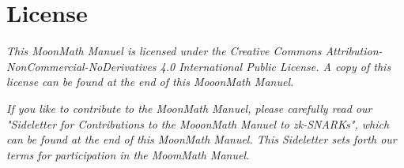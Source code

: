 \newpage
\thispagestyle{empty}
\mbox{}
\newpage

\chapter*{License}
\textit{This MoonMath Manuel is licensed under the Creative Commons Attribution-NonCommercial-NoDerivatives 4.0 International Public License. A copy of this license can be found at the end of this MooonMath Manuel. }

\textit{If you like to contribute to the MoonMath Manuel, please carefully read our "Sideletter for Contributions to the MooonMath Manuel to zk-SNARKs", which can be found at the end of this MoonMath Manuel. This Sideletter sets forth our terms for participation in the MoomMath Manuel.}